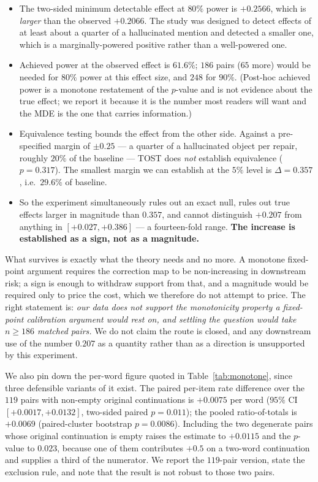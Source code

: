 \documentclass[review,number,doubleblind]{elsarticle}
\theoremstyle{plain}
\theoremstyle{definition}
\theoremstyle{remark}
\begin{document}
\begin{itemize}
\item The two-sided minimum detectable effect at $80\%$ power is $+0.2566$, which is
\emph{larger} than the observed $+0.2066$. The study was designed to detect effects of at least
about a quarter of a hallucinated mention and detected a smaller one, which is a
marginally-powered positive rather than a well-powered one.
\item Achieved power at the observed effect is $61.6\%$; $186$ pairs ($65$ more) would be needed
for $80\%$ power at this effect size, and $248$ for $90\%$. (Post-hoc achieved power is a
monotone restatement of the $p$-value and is not evidence about the true effect; we report it
because it is the number most readers will want and the MDE is the one that carries information.)
\item Equivalence testing bounds the effect from the other side. Against a pre-specified margin
of $\pm0.25$ --- a quarter of a hallucinated object per repair, roughly $20\%$ of the baseline ---
TOST does \emph{not} establish equivalence ($p=0.317$). The smallest margin we can establish at
the $5\%$ level is $\Delta=0.357$, i.e.\ $29.6\%$ of baseline.
\item So the experiment simultaneously rules out an exact null, rules out true effects larger in
magnitude than $0.357$, and cannot distinguish $+0.207$ from anything in $[+0.027,+0.386]$ --- a
fourteen-fold range. \textbf{The increase is established as a sign, not as a magnitude.}
\end{itemize}

What survives is exactly what the theory needs and no more. A monotone fixed-point argument
requires the correction map to be non-increasing in downstream risk; a sign is enough to withdraw
support from that, and a magnitude would be required only to price the cost, which we therefore do
not attempt to price. The right statement is: \emph{our data does not support the monotonicity
property a fixed-point calibration argument would rest on, and settling the question would take
$n\ge186$ matched pairs.} We do not claim the route is closed, and any downstream use of the
number $0.207$ as a quantity rather than as a direction is unsupported by this experiment.

We also pin down the per-word figure quoted in Table~\ref{tab:monotone}, since three defensible
variants of it exist. The paired per-item rate difference over the $119$ pairs with non-empty original
continuations is $+0.0075$ per word ($95\%$ CI $[+0.0017,+0.0132]$, two-sided paired $p=0.011$);
the pooled ratio-of-totals is $+0.0069$ (paired-cluster bootstrap $p=0.0086$). Including the two
degenerate pairs whose original continuation is empty raises the estimate to $+0.0115$ and the
$p$-value to $0.023$, because one of them contributes $+0.5$ on a two-word continuation and
supplies a third of the numerator. We report the $119$-pair version, state the exclusion rule, and
note that the result is not robust to those two pairs.
\end{document}
